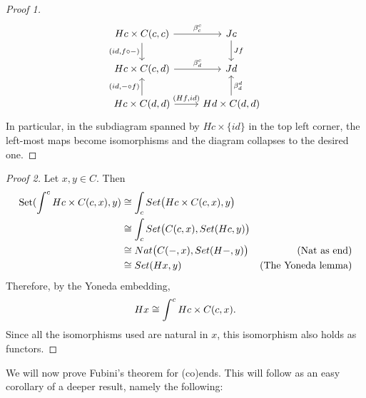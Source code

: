 \begin{proof}[Proof 1]
\[\begin{tikzcd}
{Hc\times C(c,c)} \arrow[r, "\beta^c_c"] \arrow[d, "{(id,f\circ -)}"'] & Jc \arrow[d, "Jf"]                        \\
{Hc\times C(c,d)} \arrow[r, "\beta^c_d"]                               & Jd                                        \\
{Hc\times C(d,d)} \arrow[u, "{(id,-\circ f)}"] \arrow[r, "{(Hf,id)}"]  & {Hd\times C(d,d)} \arrow[u, "\beta_d^d"']
\end{tikzcd}\]
In particular, in the subdiagram spanned by $Hc\times \{id\}$ in the top left corner, the left-most maps become isomorphisms and the diagram collapses to the desired one.

\end{proof}
\begin{proof}[Proof 2] Let $x,y\in C$. Then \begin{align*}{\text{Set}} (\int^c Hc\times C(c,x),y)&\cong \int_c Set\big(Hc\times C(c,x),y\big)\\
&\cong \int_c Set\big(C(c,x),Set(Hc,y)\big)\\
&\cong Nat\big(C(-,x),Set(H-,y)\big) & \text{(Nat as end)}\\
&\cong Set(Hx,y) &\text{(The Yoneda lemma)}
\end{align*}
Therefore, by the Yoneda embedding, 
$$Hx\cong \int^c Hc\times C(c,x).$$
Since all the isomorphisms used are natural in $x$, this isomorphism also holds as functors.
    
\end{proof}

We will now prove Fubini's theorem for (co)ends. This will follow as an easy corollary of a deeper result, namely the following:


